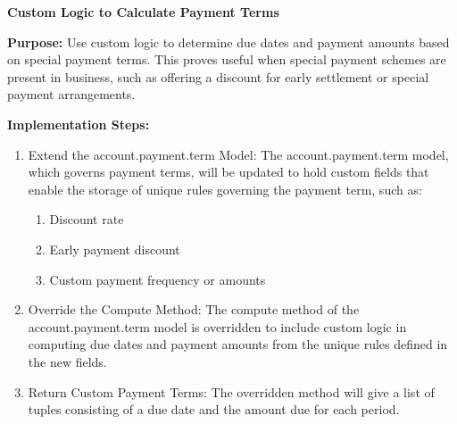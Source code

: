 \documentclass[11pt,a4paper]{article}
\begin{document}
\noindent\textbf{Custom Logic to Calculate Payment Terms}

\noindent\textbf{Purpose:} Use custom logic to determine due dates and payment amounts based on special payment terms. This proves useful when special payment schemes are present in 
business, such as offering a discount for early settlement or special payment arrangements.
\medskip

\noindent\textbf{Implementation Steps:}
\medskip

\begin{minipage}{0.5\textwidth}
\begin{enumerate}
    \item Extend the account.payment.term Model:
    The account.payment.term model, which governs 
    payment terms, will be updated to hold custom fields 
    that enable the storage of unique rules governing the 
    payment term, such as:
    
    \begin{enumerate}
        \item Discount rate
        \item Early payment discount
        \item Custom payment frequency or amounts
    \end{enumerate}
    
    \item Override the Compute Method:    
    The compute method of the account.payment.term 
    model is overridden to include custom logic in 
    computing due dates and payment amounts from the 
    unique rules defined in the new fields.
    
    \item Return Custom Payment Terms:
    The overridden method will give a list of tuples 
    consisting of a due date and the amount due for each 
    period.

\end{enumerate}

\end{minipage}%
\hfill
\end{document}
